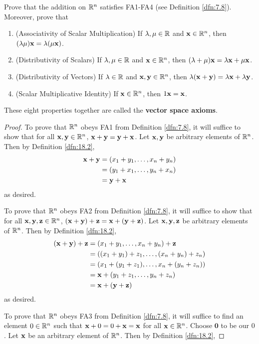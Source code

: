 \documentclass[../main.tex]{subfiles}
\begin{document}
\begin{exercise}\label{exr:18.3}
    Prove that the addition on $\mathbb{R}^n$ satisfies FA1-FA4 (see Definition \ref{dfn:7.8}). Moreover, prove that
    \begin{enumerate}[label={VS\arabic*.}]
        \item (Associativity of Scalar Multiplication) If $\lambda,\mu\in\mathbb{R}$ and $\mathbf{x}\in\mathbb{R}^n$, then $(\lambda\mu)\mathbf{x}=\lambda(\mu\mathbf{x})$.
        \item (Distributivity of Scalars) If $\lambda,\mu\in\mathbb{R}$ and $\mathbf{x}\in\mathbb{R}^n$, then $(\lambda+\mu)\mathbf{x}=\lambda\mathbf{x}+\mu\mathbf{x}$.
        \item (Distributivity of Vectors) If $\lambda\in\mathbb{R}$ and $\mathbf{x},\mathbf{y}\in\mathbb{R}^n$, then $\lambda(\mathbf{x}+\mathbf{y})=\lambda\mathbf{x}+\lambda\mathbf{y}$.
        \item (Scalar Multiplicative Identity) If $\mathbf{x}\in\mathbb{R}^n$, then $1\mathbf{x}=\mathbf{x}$.
    \end{enumerate}
    These eight properties together are called the \textbf{vector space axioms}.
    \begin{proof}
        To prove that $\mathbb{R}^n$ obeys FA1 from Definition \ref{dfn:7.8}, it will suffice to show that for all $\mathbf{x},\mathbf{y}\in\mathbb{R}^n$, $\mathbf{x}+\mathbf{y}=\mathbf{y}+\mathbf{x}$. Let $\mathbf{x},\mathbf{y}$ be arbitrary elements of $\mathbb{R}^n$. Then by Definition \ref{dfn:18.2},
        \begin{align*}
            \mathbf{x}+\mathbf{y} &= (x_1+y_1,\dots,x_n+y_n)\\
            &= (y_1+x_1,\dots,y_n+x_n)\\
            &= \mathbf{y}+\mathbf{x}
        \end{align*}
        as desired.\par
        To prove that $\mathbb{R}^n$ obeys FA2 from Definition \ref{dfn:7.8}, it will suffice to show that for all $\mathbf{x},\mathbf{y},\mathbf{z}\in\mathbb{R}^n$, $(\mathbf{x}+\mathbf{y})+\mathbf{z}=\mathbf{x}+(\mathbf{y}+\mathbf{z})$. Let $\mathbf{x},\mathbf{y},\mathbf{z}$ be arbitrary elements of $\mathbb{R}^n$. Then by Definition \ref{dfn:18.2},
        \begin{align*}
            (\mathbf{x}+\mathbf{y})+\mathbf{z} &= (x_1+y_1,\dots,x_n+y_n)+\mathbf{z}\\
            &= ((x_1+y_1)+z_1,\dots,(x_n+y_n)+z_n)\\
            &= (x_1+(y_1+z_1),\dots,x_n+(y_n+z_n))\\
            &= \mathbf{x}+(y_1+z_1,\dots,y_n+z_n)\\
            &= \mathbf{x}+(\mathbf{y}+\mathbf{z})
        \end{align*}
        as desired.\par
        To prove that $\mathbb{R}^n$ obeys FA3 from Definition \ref{dfn:7.8}, it will suffice to find an element $0\in\mathbb{R}^n$ such that $\mathbf{x}+0=0+\mathbf{x}=\mathbf{x}$ for all $\mathbf{x}\in\mathbb{R}^n$. Choose $\bm{0}$ to be our $0$. Let $\mathbf{x}$ be an arbitrary element of $\mathbb{R}^n$. Then by Definition \ref{dfn:18.2},

\end{proof}
\end{exercise}
\end{document}
